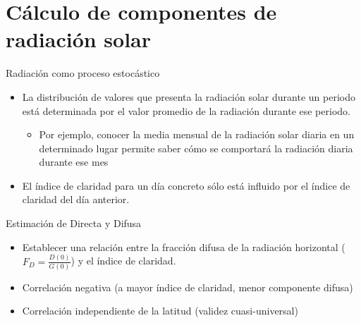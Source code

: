 \documentclass[xcolor={usenames,svgnames,dvipsnames}]{beamer}
\begin{document}
\section{Cálculo de componentes de radiación solar}
\label{sec:org266a17f}

\begin{frame}[label={sec:org8320b1f}]{Radiación como proceso estocástico}
\begin{itemize}
\item La \alert{distribución de valores} que presenta la radiación solar durante un periodo está \alert{determinada por el valor promedio de la radiación durante ese periodo}.

\begin{itemize}
\item Por ejemplo, conocer la media mensual de la radiación solar diaria en un determinado lugar permite saber cómo se comportará la radiación diaria durante ese mes
\end{itemize}

\item El índice de claridad para un día concreto \alert{sólo está influido} por el índice de claridad del \alert{día anterior}.
\end{itemize}
\end{frame}

\begin{frame}[label={sec:orgcd4dda4}]{Estimación de Directa y Difusa}
\begin{itemize}
\item Establecer una \alert{relación entre la fracción difusa} de la radiación horizontal (\(F_{D}=\frac{D(0)}{G(0)}\)) y \alert{el índice de claridad}.

\item \alert{Correlación negativa} (a mayor índice de claridad, menor componente difusa)

\item \alert{Correlación independiente de la latitud} (validez cuasi-universal)
\end{itemize}
\end{frame}
\end{document}
